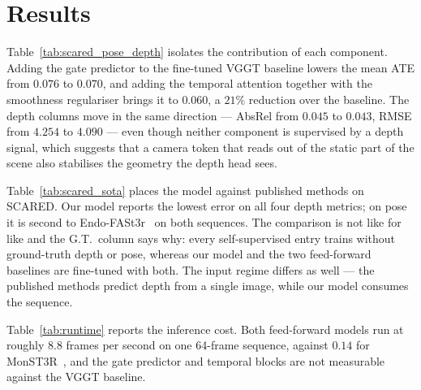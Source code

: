 \documentclass[11pt]{article}
\begin{document}
\section*{Results}

Table~\ref{tab:scared_pose_depth} isolates the contribution of each component. Adding the gate
predictor to the fine-tuned VGGT baseline lowers the mean ATE from $0.076$ to $0.070$, and adding
the temporal attention together with the smoothness regulariser brings it to $0.060$, a $21\%$
reduction over the baseline. The depth columns move in the same direction --- AbsRel from $0.045$
to $0.043$, RMSE from $4.254$ to $4.090$ --- even though neither component is supervised by a
depth signal, which suggests that a camera token that reads out of the static part of the scene
also stabilises the geometry the depth head sees.

Table~\ref{tab:scared_sota} places the model against published methods on SCARED. Our model
reports the lowest error on all four depth metrics; on pose it is second to
Endo-FASt3r~\cite{zeinoddin2025endofast3r} on both sequences. The comparison is not like for like
and the G.T.\ column says why: every self-supervised entry trains without ground-truth depth or
pose, whereas our model and the two feed-forward baselines are fine-tuned with both. The input
regime differs as well --- the published methods predict depth from a single image, while our
model consumes the sequence.

Table~\ref{tab:runtime} reports the inference cost. Both feed-forward models run at roughly
$8.8$ frames per second on one 64-frame sequence, against $0.14$ for
MonST3R~\cite{zhang2025monst3r}, and the gate predictor and temporal blocks are not measurable
against the VGGT baseline.
\end{document}
